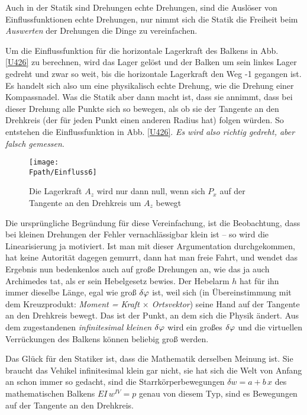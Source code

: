 Auch in der Statik sind Drehungen echte Drehungen, sind die Ausl\"{o}ser von Einflussfunktionen echte Drehungen, nur nimmt sich die Statik die Freiheit beim {\em Auswerten\/} der Drehungen die Dinge zu vereinfachen.

Um die Einflussfunktion f\"{u}r die horizontale Lagerkraft des Balkens in Abb. \ref{U426} zu berechnen, wird das Lager gel\"{o}st und der Balken um sein linkes Lager gedreht und zwar so weit, bis die horizontale Lagerkraft den Weg -1 gegangen ist. Es handelt sich also um eine physikalisch echte Drehung, wie die Drehung einer Kompassnadel. Was die Statik aber dann macht ist, dass sie annimmt, dass bei dieser Drehung alle Punkte sich so bewegen, als ob sie der Tangente an den Drehkreis (der f\"{u}r jeden Punkt einen anderen Radius hat) folgen w\"{u}rden. So entstehen die Einflussfunktion in Abb. \ref{U426}. {\em Es wird also richtig gedreht, aber \glq falsch\grq{} gemessen\/}.

\begin{figure}[tbp]
\centering
\if {} \sidecaption \fi
\texttt{[image: \\Fpath/Einfluss6]}
\caption{Die Lagerkraft $A_z$ wird nur dann null, wenn sich $P_x$ auf der Tangente an den Drehkreis um $A_z$ bewegt} \label{Einfluss6}
\end{figure}%
Die urspr\"{u}ngliche Begr\"{u}ndung f\"{u}r diese Vereinfachung, ist die Beobachtung, dass bei kleinen Drehungen der Fehler vernachl\"{a}ssigbar klein ist -- so wird die Linearisierung ja motiviert. Ist man mit dieser Argumentation durchgekommen, hat keine Autorit\"{a}t dagegen gemurrt, dann hat man freie Fahrt, und wendet das Ergebnis nun bedenkenlos auch auf gro{\ss}e Drehungen an, wie das ja auch Archimedes tat, als er sein Hebelgesetz bewies. Der Hebelarm $h$ hat f\"{u}r ihn immer dieselbe L\"{a}nge, egal wie gro{\ss} $\delta \varphi$ ist, weil sich (in \"{U}bereinstimmung mit dem Kreuzprodukt: {\em Moment = Kraft $\times$ Ortsvektor\/}) seine Hand auf der Tangente an den Drehkreis bewegt. Das ist der Punkt, an dem sich die Physik \"{a}ndert. Aus dem zugestandenen {\em infinitesimal kleinen $\delta \varphi$\/} wird ein gro{\ss}es $\delta \varphi$ und die virtuellen Verr\"{u}ckungen des Balkens k\"{o}nnen beliebig gro{\ss} werden.

Das Gl\"{u}ck f\"{u}r den Statiker ist, dass die Mathematik derselben Meinung ist. Sie braucht das Vehikel infinitesimal klein gar nicht, sie hat sich die Welt von Anfang an schon immer so gedacht, sind die Starrk\"{o}rperbewegungen $\delta w = a + b\,x $ des mathematischen Balkens $EI\,w^{IV} = p$ genau von diesem Typ, sind es Bewegungen auf der Tangente an den Drehkreis.


